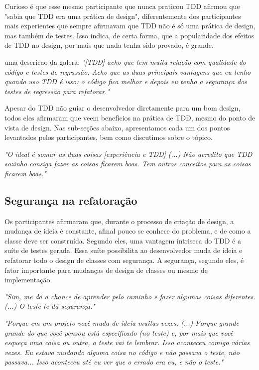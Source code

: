 Curioso é que esse mesmo participante que nunca praticou TDD afirmou que "sabia que TDD era uma prática de design",
diferentemente dos participantes mais experientes que sempre afirmavam que TDD não é só uma prática de design,
mas também de testes. Isso indica, de certa forma, que a popularidade dos efeitos de TDD no design, por mais
que nada tenha sido provado, é grande.

uma descricao da galera: \textit{"[TDD] acho que tem muita relação com qualidade do código e testes 
de regrassão. Acho que as duas principais vantagens que eu tenho quando uso TDD é isso: o código
fica melhor e depois eu tenho a segurança dos testes de regressão para refatorar."}

Apesar do TDD não guiar o desenvolvedor diretamente para um bom design,
todos eles afirmaram que veem benefícios na prática de TDD, mesmo do
ponto de vista de design. Nas sub-seções abaixo, apresentamos cada um dos pontos 
levantados pelos participantes, bem como discutimos sobre o tópico.

\textit{"O ideal é somar as duas coisas [experiência e TDD] (...) 
Não acredito que TDD sozinho consiga fazer as coisas ficarem boas. Tem outros conceitos
para as coisas ficarem boas."}



\subsection{Segurança na refatoração}

Os participantes afirmaram que, durante o processo de criação de design, a mudança de ideia é
constante, afinal pouco se conhece do problema, e de como a classe deve ser construída. Segundo eles,
uma vantagem íntriseca do TDD é a suíte de testes gerada. Essa suíte possibilita ao desenvolvedor
muda de ideia e refatorar todo o design de classes com segurança.
A segurança, segundo eles, é fator importante para mudanças de design de classes ou mesmo de implementação.


\textit{"Sim, me dá a chance de aprender pelo caminho e fazer algumas coisas diferentes. (...) O teste te dá segurança."}

\textit{"Porque em um projeto você muda de ideia muitas vezes. (...) Porque grande grande do que você
pensou está especificado (no teste) e, por mais que você esqueça uma coisa ou outra, o teste vai
te lembrar. Isso aconteceu comigo várias vezes. Eu estava mudando alguma coisa no código e não passava
o teste, não passava... Isso aconteceu até eu ver que o errado era eu, e não o teste."}

